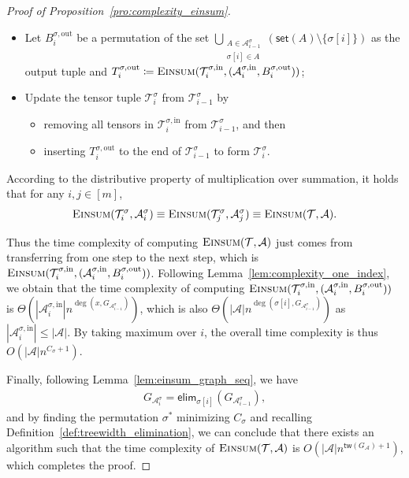 \documentclass[12pt]{article}
\theoremstyle{plain}
\theoremstyle{definition}
\newcommand{\takesetp}[1]{\mathsf{set}(#1)}
\newcommand{\tensorcontraction}{\textsc{Einsum}}
\newcommand{\degp}[2]{\deg(#1,#2)}
\newcommand{\treewidthp}[1]{\mathsf{tw}(#1)}
\newcommand{\graphform}[1]{G_{#1}}
\newcommand{\less}{O}
\newcommand{\appequal}{\Theta}
\newcommand{\eliminatevg}[2]{\mathsf{elim}_{#1}(#2)}
\def\calA{\mathcal{A}}
\def\calT{\mathcal{T}}
\begin{document}
\begin{bibunit}[agsm]
\begin{proof}[Proof of Proposition~\ref{pro:complexity_einsum}]
\begin{itemize}
    \item Let $B^{\sigma, \mathrm{out}}_i$ be a permutation of the set $\bigcup_{\substack{A \in \calA^{\sigma}_{i-1} \\ \sigma[i] \in A}} (\takesetp{A} \setminus \{\sigma[i]\})$ as the output tuple and $T^{\sigma, \mathrm{out}}_i \coloneqq \tensorcontraction(\calT^{\sigma, \mathrm{in}}_i, (\calA^{\sigma, \mathrm{in}}_i, B^{\sigma, \mathrm{out}}_i))$;
    
    \item Update the tensor tuple $\calT^{\sigma}_i$ from $\calT^{\sigma}_{i-1}$ by
    \begin{itemize}
        \item removing all tensors in $\calT^{\sigma, \mathrm{in}}_i$ from $\calT^{\sigma}_{i-1}$, and then
        \item inserting $T^{\sigma, \mathrm{out}}_i$ to the end of $\calT^{\sigma}_{i-1}$ to form $\calT^{\sigma}_{i}$.
    \end{itemize}
\end{itemize}

According to the distributive property of multiplication over summation, it holds that for any $i,j \in [m]$, 
\begin{align*}
\tensorcontraction(\calT^\sigma_i, \calA^\sigma_i) \equiv  \tensorcontraction(\calT^\sigma_j, \calA^\sigma_j) \equiv \tensorcontraction(\calT, \calA).
\end{align*}

Thus the time complexity of computing $\tensorcontraction(\calT, \calA)$ just comes from transferring from one step to the next step, which is $\tensorcontraction(\calT^{\sigma, \mathrm{in}}_i, (\calA^{\sigma, \mathrm{in}}_i, B^{\sigma, \mathrm{out}}_i))$. Following Lemma~\ref{lem:complexity_one_index}, we obtain that the time complexity of computing $\tensorcontraction(\calT^{\sigma, \mathrm{in}}_i, (\calA^{\sigma, \mathrm{in}}_i, B^{\sigma, \mathrm{out}}_i))$ is $\appequal(|\calA^{\sigma, \mathrm{in}}_i| n^{\degp{x}{\graphform{\calA^{\sigma}_{i-1}}}})$, which is also $\appequal(|\calA|n^{\degp{\sigma[i]}{\graphform{\calA^{\sigma}_{i-1}}}})$ as $|\calA^{\sigma, \mathrm{in}}_i| \leq |\calA|$. By taking maximum over $i$, the overall time complexity is thus $\less(|\calA|n^{C_\sigma + 1})$.

Finally, following Lemma~\ref{lem:einsum_graph_seq}, we have
\begin{align*}
\graphform{\calA^{\sigma}_i} = \eliminatevg{\sigma[i]}{\graphform{\calA^{\sigma}_{i-1}}},
\end{align*}
and by finding the permutation $\sigma^{\ast}$ minimizing $ C_{\sigma}$ and recalling Definition~\ref{def:treewidth_elimination}, we can conclude that there exists an algorithm such that the time complexity of $\tensorcontraction(\calT, \calA)$ is $\less(|\calA|n^{\treewidthp{G_\calA}+1})$, which completes the proof. 
\end{proof}


\end{bibunit}
\end{document}
